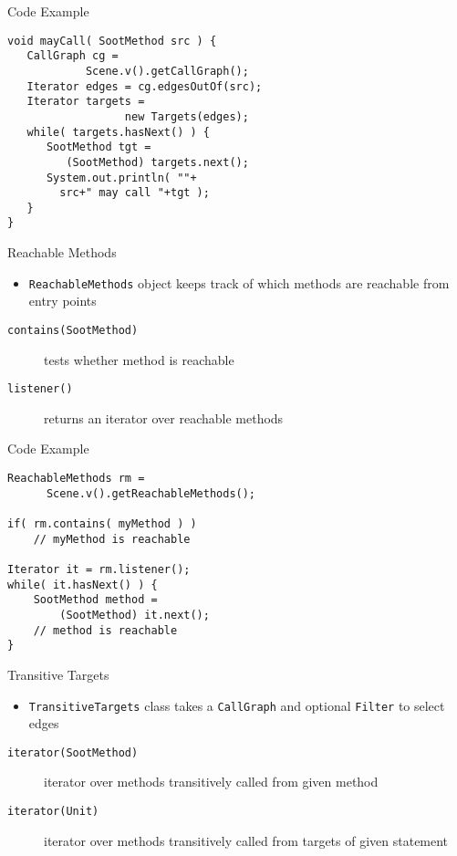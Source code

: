 \begin{slide}{Code Example}
\vspace*{-5mm}
\begin{verbatim}
void mayCall( SootMethod src ) {
   CallGraph cg =
            Scene.v().getCallGraph();
   Iterator edges = cg.edgesOutOf(src);
   Iterator targets =
                  new Targets(edges);
   while( targets.hasNext() ) {
      SootMethod tgt =
         (SootMethod) targets.next();
      System.out.println( ""+
        src+" may call "+tgt );
   }
}
\end{verbatim}
\end{slide}

\begin{slide}{Reachable Methods}
\begin{itemize}
\item \texttt{ReachableMethods} object keeps track of which methods are
reachable from entry points
\end{itemize}
\begin{description}
\item [\texttt{contains(SootMethod)}] tests whether method is reachable
\item [\texttt{listener()}] returns an iterator over reachable methods
\end{description}
\end{slide}

\begin{slide}{Code Example}
\begin{verbatim}
ReachableMethods rm =
      Scene.v().getReachableMethods();

if( rm.contains( myMethod ) ) 
    // myMethod is reachable

Iterator it = rm.listener();
while( it.hasNext() ) {
    SootMethod method = 
        (SootMethod) it.next();
    // method is reachable
}
\end{verbatim}
\end{slide}

\begin{slide}{Transitive Targets}
\begin{itemize}
\item {\tt TransitiveTargets} class takes a {\tt CallGraph} and
optional {\tt Filter} to select edges
\end{itemize}
\begin{description}
\item [\texttt{iterator(SootMethod)}] iterator over methods transitively
called from given method
\item [\texttt{iterator(Unit)}] iterator over methods transitively
called from targets of given statement
\end{description}
\end{slide}

